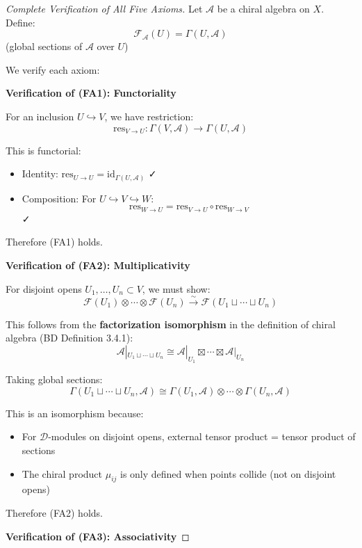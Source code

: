 \begin{proof}[Complete Verification of All Five Axioms]

Let $\mathcal{A}$ be a chiral algebra on $X$. Define:
$$\mathcal{F}_{\mathcal{A}}(U) = \Gamma(U, \mathcal{A})$$
(global sections of $\mathcal{A}$ over $U$)

We verify each axiom:

\textbf{Verification of (FA1): Functoriality}

For an inclusion $U \hookrightarrow V$, we have restriction:
$$\text{res}_{V \to U}: \Gamma(V, \mathcal{A}) \to \Gamma(U, \mathcal{A})$$

This is functorial:
\begin{itemize}
\item Identity: $\text{res}_{U \to U} = \text{id}_{\Gamma(U,\mathcal{A})}$ ✓
\item Composition: For $U \hookrightarrow V \hookrightarrow W$:
   $$\text{res}_{W \to U} = \text{res}_{V \to U} \circ \text{res}_{W \to V}$$ ✓
\end{itemize}

Therefore (FA1) holds.

\textbf{Verification of (FA2): Multiplicativity}

For disjoint opens $U_1, \ldots, U_n \subset V$, we must show:
$$\mathcal{F}(U_1) \otimes \cdots \otimes \mathcal{F}(U_n) \xrightarrow{\sim} 
   \mathcal{F}(U_1 \sqcup \cdots \sqcup U_n)$$

This follows from the \textbf{factorization isomorphism} in the definition of chiral 
algebra (BD Definition 3.4.1):
$$\mathcal{A}|_{U_1 \sqcup \cdots \sqcup U_n} \cong 
   \mathcal{A}|_{U_1} \boxtimes \cdots \boxtimes \mathcal{A}|_{U_n}$$

Taking global sections:
$$\Gamma(U_1 \sqcup \cdots \sqcup U_n, \mathcal{A}) \cong 
   \Gamma(U_1, \mathcal{A}) \otimes \cdots \otimes \Gamma(U_n, \mathcal{A})$$

This is an isomorphism because:
\begin{itemize}
\item For $\mathcal{D}$-modules on disjoint opens, external tensor product = tensor 
   product of sections
\item The chiral product $\mu_{ij}$ is only defined when points collide (not on disjoint 
   opens)
\end{itemize}

Therefore (FA2) holds.

\textbf{Verification of (FA3): Associativity}


\end{proof}
